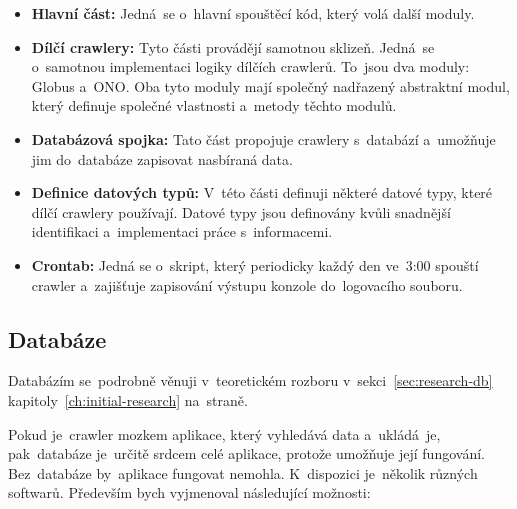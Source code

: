 \begin{itemize}
    \item \textbf{Hlavní část:} Jedná~se o~hlavní spouštěcí kód, který volá
        další moduly.
    \item \textbf{Dílčí crawlery:} Tyto části provádějí samotnou sklizeň.
        Jedná~se o~samotnou implementaci logiky dílčích crawlerů. To~jsou
        dva moduly: Globus a~ONO. Oba tyto moduly mají společný nadřazený
        abstraktní modul, který definuje společné vlastnosti a~metody
        těchto modulů.
    \item \textbf{Databázová spojka:} Tato část propojuje crawlery s~databází
        a~umožňuje jim do~databáze zapisovat nasbíraná data.
    \item \textbf{Definice datových typů:} V~této části definuji některé
        datové typy, které dílčí crawlery používají. Datové typy jsou
        definovány kvůli snadnější identifikaci a~implementaci práce
        s~informacemi.
    \item \textbf{Crontab:} Jedná se o~skript, který periodicky každý den
        ve~3:00 spouští crawler a~zajišťuje zapisování výstupu konzole
        do~logovacího souboru.
\end{itemize}

\subsection{Databáze}
\label{sec:preps-db}

Databázím se~podrobně věnuji v~teoretickém rozboru
v~sekci~\ref{sec:research-db} kapitoly~\ref{ch:initial-research}
na~straně\pageref{sec:research-db}.

Pokud je~crawler mozkem aplikace, který vyhledává data a~ukládá~je,
pak~databáze je~určitě srdcem celé aplikace, protože umožňuje její fungování.
Bez~databáze by~aplikace fungovat nemohla. K~dispozici je~několik různých
softwarů. Především bych vyjmenoval následující možnosti:

